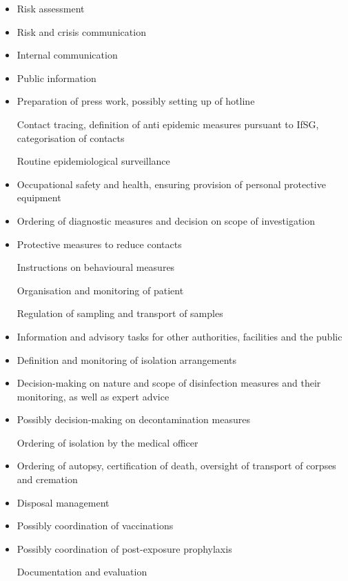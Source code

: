 \documentclass{article}
\begin{document}
\begin{itemize}
\item Risk assessment


\item Risk and crisis communication


\item Internal communication


\item Public information


\item Preparation of press work, possibly setting up of hotline

Contact tracing, definition of anti epidemic measures pursuant to IfSG, categorisation of contacts

Routine epidemiological surveillance


\item Occupational safety and health, ensuring provision of personal protective equipment


\item Ordering of diagnostic measures and decision on scope of investigation


\item Protective measures to reduce contacts

Instructions on behavioural measures

Organisation and monitoring of patient

Regulation of sampling and transport of samples


\item Information and advisory tasks for other authorities, facilities and the public


\item Definition and monitoring of isolation arrangements


\item Decision-making on nature and scope of disinfection measures and their monitoring, as well as expert advice


\item Possibly decision-making on decontamination measures

Ordering of isolation by the medical officer


\item Ordering of autopsy, certification of death, oversight of transport of corpses and cremation


\item Disposal management


\item Possibly coordination of vaccinations


\item Possibly coordination of post-exposure prophylaxis

Documentation and evaluation


\end{itemize}
\end{document}
